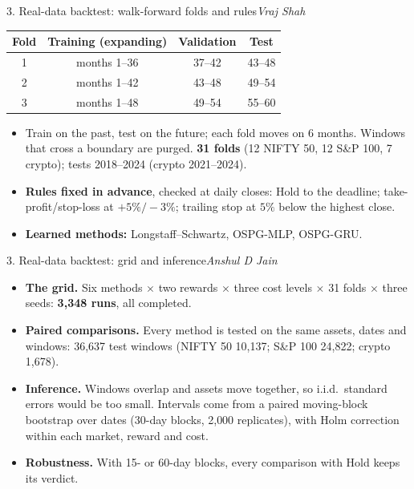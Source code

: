 \documentclass[aspectratio=169,11pt]{beamer}
\newcommand{\by}[1]{\hfill{\normalfont\small\itshape #1}}
\begin{document}
\begin{frame}{3. Real-data backtest: walk-forward folds and rules\by{Vraj Shah}}
\centering\small
\begin{tabular}{cccc}
\toprule
Fold & Training (expanding) & Validation & Test\\
\midrule
1 & months 1--36 & 37--42 & 43--48\\
2 & months 1--42 & 43--48 & 49--54\\
3 & months 1--48 & 49--54 & 55--60\\
\bottomrule
\end{tabular}

\vspace{6pt}\raggedright
\begin{itemize}\small
\item Train on the past, test on the future; each fold moves on 6 months. Windows that cross a
  boundary are purged. \textbf{31 folds} (12 NIFTY 50, 12 S\&P 100, 7 crypto); tests 2018--2024
  (crypto 2021--2024).
\item \textbf{Rules fixed in advance}, checked at daily closes: Hold to the deadline;
  take-profit/stop-loss at $+5\%/-3\%$; trailing stop at $5\%$ below the highest close.
\item \textbf{Learned methods:} Longstaff--Schwartz, OSPG-MLP, OSPG-GRU.
\end{itemize}
\end{frame}

\begin{frame}{3. Real-data backtest: grid and inference\by{Anshul D Jain}}
\begin{itemize}
\item \textbf{The grid.} Six methods $\times$ two rewards $\times$ three cost levels $\times$ 31 folds
  $\times$ three seeds: \textbf{3{,}348 runs}, all completed.
\item \textbf{Paired comparisons.} Every method is tested on the same assets, dates and windows:
  36{,}637 test windows (NIFTY 50 10{,}137; S\&P 100 24{,}822; crypto 1{,}678).
\item \textbf{Inference.} Windows overlap and assets move together, so i.i.d.\ standard errors
  would be too small. Intervals come from a paired moving-block bootstrap over dates
  (30-day blocks, 2{,}000 replicates), with Holm correction within each market, reward and cost.
\item \textbf{Robustness.} With 15- or 60-day blocks, every comparison with Hold keeps its verdict.
\end{itemize}
\end{frame}
\end{document}
